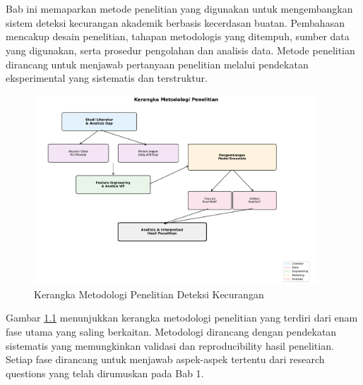 \chapter{\babTiga}
\label{bab:3}
Bab ini memaparkan metode penelitian yang digunakan untuk mengembangkan sistem deteksi kecurangan akademik berbasis kecerdasan buatan. Pembahasan mencakup desain penelitian, tahapan metodologis yang ditempuh, sumber data yang digunakan, serta prosedur pengolahan dan analisis data. Metode penelitian dirancang untuk menjawab pertanyaan penelitian melalui pendekatan eksperimental yang sistematis dan terstruktur.

\begin{figure}[htbp]
    \centering
    \includegraphics[width=0.95\textwidth]{newfigures/research_methodology_stages.pdf}
    \caption{Kerangka Metodologi Penelitian Deteksi Kecurangan}
    \label{fig:research_stages}
\end{figure}

Gambar \ref{fig:research_stages} menunjukkan kerangka metodologi penelitian yang terdiri dari enam fase utama yang saling berkaitan. Metodologi dirancang dengan pendekatan sistematis yang memungkinkan validasi dan reproducibility hasil penelitian. Setiap fase dirancang untuk menjawab aspek-aspek tertentu dari research questions yang telah dirumuskan pada Bab 1.

